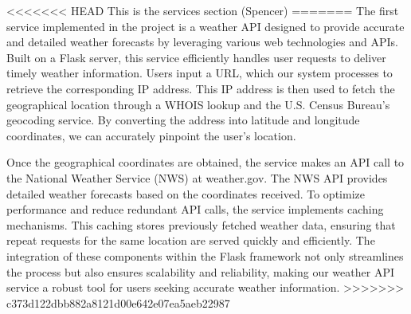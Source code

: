 <<<<<<< HEAD
This is the services section (Spencer)
=======
The first service implemented in the project is a weather API designed to provide accurate and detailed weather forecasts by leveraging various web technologies and APIs. Built on a Flask server, this service efficiently handles user requests to deliver timely weather information. Users input a URL, which our system processes to retrieve the corresponding IP address. This IP address is then used to fetch the geographical location through a WHOIS lookup and the U.S. Census Bureau's geocoding service. By converting the address into latitude and longitude coordinates, we can accurately pinpoint the user's location.

Once the geographical coordinates are obtained, the service makes an API call to the National Weather Service (NWS) at weather.gov. The NWS API provides detailed weather forecasts based on the coordinates received. To optimize performance and reduce redundant API calls, the service implements caching mechanisms. This caching stores previously fetched weather data, ensuring that repeat requests for the same location are served quickly and efficiently. The integration of these components within the Flask framework not only streamlines the process but also ensures scalability and reliability, making our weather API service a robust tool for users seeking accurate weather information.
>>>>>>> c373d122dbb882a8121d00e642e07ea5aeb22987
